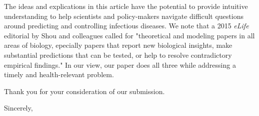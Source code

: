 \documentclass[10pt]{letter}
\begin{document}
\begin{letter}{
}
The ideas and explications in this article have the potential to provide intuitive understanding to help scientists and policy-makers navigate difficult questions around predicting and controlling infectious diseases.  We note that a 2015 \emph{eLife} editorial by Shou and colleagues \cite{shou2015theory} called for "theoretical and modeling papers in all areas of biology, epecially papers that report new biological insights, make substantial predictions that can be tested, or help to resolve contradictory empirical findings." In our view, our paper does all three while addressing a timely and health-relevant problem.

Thank you for your consideration of our submission.

\closing{Sincerely,}



\end{letter}
\end{document}
